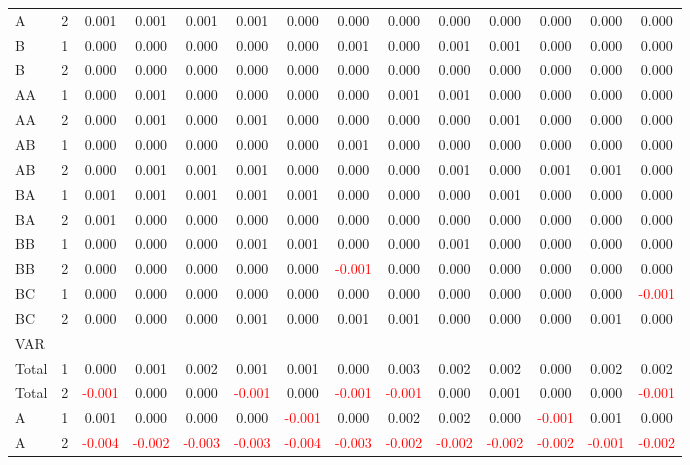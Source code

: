 \begin{table}[H]
{\begin{tabular}{llcccccccccccc}
A & 2 & 0.001 & 0.001 & 0.001 & 0.001 & 0.000 & 0.000 & 0.000 & 0.000 & 0.000 & 0.000 & 0.000 & 0.000\\
B & 1 & 0.000 & 0.000 & 0.000 & 0.000 & 0.000 & 0.001 & 0.000 & 0.001 & 0.001 & 0.000 & 0.000 & 0.000\\
B & 2 & 0.000 & 0.000 & 0.000 & 0.000 & 0.000 & 0.000 & 0.000 & 0.000 & 0.000 & 0.000 & 0.000 & 0.000\\
AA & 1 & 0.000 & 0.001 & 0.000 & 0.000 & 0.000 & 0.000 & 0.001 & 0.001 & 0.000 & 0.000 & 0.000 & 0.000\\
AA & 2 & 0.000 & 0.001 & 0.000 & 0.001 & 0.000 & 0.000 & 0.000 & 0.000 & 0.001 & 0.000 & 0.000 & 0.000\\
AB & 1 & 0.000 & 0.000 & 0.000 & 0.000 & 0.000 & 0.001 & 0.000 & 0.000 & 0.000 & 0.000 & 0.000 & 0.000\\
AB & 2 & 0.000 & 0.001 & 0.001 & 0.001 & 0.000 & 0.000 & 0.000 & 0.001 & 0.000 & 0.001 & 0.001 & 0.000\\
BA & 1 & 0.001 & 0.001 & 0.001 & 0.001 & 0.001 & 0.000 & 0.000 & 0.000 & 0.001 & 0.000 & 0.000 & 0.000\\
BA & 2 & 0.001 & 0.000 & 0.000 & 0.000 & 0.000 & 0.000 & 0.000 & 0.000 & 0.000 & 0.000 & 0.000 & 0.000\\
BB & 1 & 0.000 & 0.000 & 0.000 & 0.001 & 0.001 & 0.000 & 0.000 & 0.001 & 0.000 & 0.000 & 0.000 & 0.000\\
BB & 2 & 0.000 & 0.000 & 0.000 & 0.000 & 0.000 & \textcolor{red}{-0.001} & 0.000 & 0.000 & 0.000 & 0.000 & 0.000 & 0.000\\
BC & 1 & 0.000 & 0.000 & 0.000 & 0.000 & 0.000 & 0.000 & 0.000 & 0.000 & 0.000 & 0.000 & 0.000 & \textcolor{red}{-0.001}\\
BC & 2 & 0.000 & 0.000 & 0.000 & 0.001 & 0.000 & 0.001 & 0.001 & 0.000 & 0.000 & 0.000 & 0.001 & 0.000\\
\hline
VAR &  &  &  &  &  &  &  &  &  &  &  &  & \\
\hline
Total & 1 & 0.000 & 0.001 & 0.002 & 0.001 & 0.001 & 0.000 & 0.003 & 0.002 & 0.002 & 0.000 & 0.002 & 0.002\\
Total & 2 & \textcolor{red}{-0.001} & 0.000 & 0.000 & \textcolor{red}{-0.001} & 0.000 & \textcolor{red}{-0.001} & \textcolor{red}{-0.001} & 0.000 & 0.001 & 0.000 & 0.000 & \textcolor{red}{-0.001}\\
A & 1 & 0.001 & 0.000 & 0.000 & 0.000 & \textcolor{red}{-0.001} & 0.000 & 0.002 & 0.002 & 0.000 & \textcolor{red}{-0.001} & 0.001 & 0.000\\
A & 2 & \textcolor{red}{-0.004} & \textcolor{red}{-0.002} & \textcolor{red}{-0.003} & \textcolor{red}{-0.003} & \textcolor{red}{-0.004} & \textcolor{red}{-0.003} & \textcolor{red}{-0.002} & \textcolor{red}{-0.002} & \textcolor{red}{-0.002} & \textcolor{red}{-0.002} & \textcolor{red}{-0.001} & \textcolor{red}{-0.002}\\

\end{tabular}}
\end{table}
